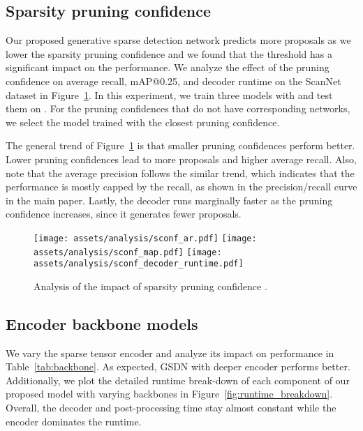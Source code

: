 \documentclass[runningheads]{llncs}
\begin{document}
\subsection{Sparsity pruning confidence}

Our proposed generative sparse detection network predicts more proposals as we lower the sparsity pruning confidence  and we found that the threshold  has a significant impact on the performance. We analyze the effect of the pruning confidence on average recall, mAP@0.25, and decoder runtime on the ScanNet dataset in Figure~\ref{fig:sparsity_pruning_confidence}. In this experiment, we train three models with  and test them on . For the pruning confidences that do not have corresponding networks, we select the model trained with the closest pruning confidence.

The general trend of Figure~\ref{fig:sparsity_pruning_confidence} is that smaller pruning confidences  perform better. Lower pruning confidences lead to more proposals and higher average recall. Also, note that the average precision follows the similar trend, which indicates that the performance is mostly capped by the recall, as shown in the precision/recall curve in the main paper. Lastly, the decoder runs marginally faster as the pruning confidence increases, since it generates fewer proposals.

\begin{figure}
    \centering
    \texttt{[image: assets/analysis/sconf\_ar.pdf]}
    \texttt{[image: assets/analysis/sconf\_map.pdf]}
    \texttt{[image: assets/analysis/sconf\_decoder\_runtime.pdf]}
    \caption{Analysis of the impact of sparsity pruning confidence .}
    \label{fig:sparsity_pruning_confidence}
\end{figure}

\subsection{Encoder backbone models}

We vary the sparse tensor encoder and analyze its impact on performance in Table~\ref{tab:backbone}. As expected, GSDN with deeper encoder performs better. Additionally, we plot the detailed runtime break-down of each component of our proposed model with varying backbones in Figure~\ref{fig:runtime_breakdown}. Overall, the decoder and post-processing time stay almost constant while the encoder dominates the runtime.
\end{document}
